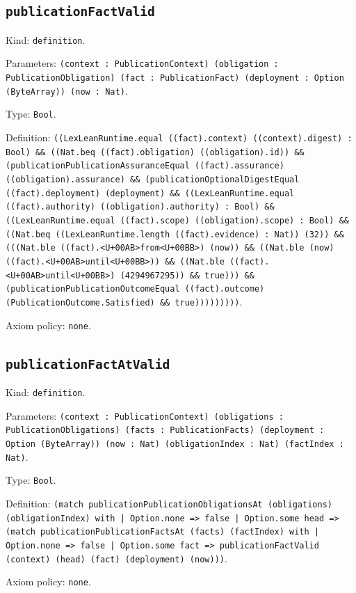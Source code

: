 \documentclass[11pt]{article}
\begin{document}
\subsection*{\texttt{publicationFactValid}}
\noindent Kind: \texttt{definition}.\par
\noindent Parameters: \texttt{(context : PublicationContext) (obligation : PublicationObligation) (fact : PublicationFact) (deployment : Option (ByteArray)) (now : Nat)}.\par
\noindent Type: \texttt{Bool}.\par
\noindent Definition: \texttt{((LexLeanRuntime.equal ((fact).context) ((context).digest) : Bool) \&\& ((Nat.beq ((fact).obligation) ((obligation).id)) \&\& (publicationPublicationAssuranceEqual ((fact).assurance) ((obligation).assurance) \&\& (publicationOptionalDigestEqual ((fact).deployment) (deployment) \&\& ((LexLeanRuntime.equal ((fact).authority) ((obligation).authority) : Bool) \&\& ((LexLeanRuntime.equal ((fact).scope) ((obligation).scope) : Bool) \&\& ((Nat.beq ((LexLeanRuntime.length ((fact).evidence) : Nat)) (32)) \&\& (((Nat.ble ((fact).<U+00AB>from<U+00BB>) (now)) \&\& ((Nat.ble (now) ((fact).<U+00AB>until<U+00BB>)) \&\& ((Nat.ble ((fact).<U+00AB>until<U+00BB>) (4294967295)) \&\& true))) \&\& (publicationPublicationOutcomeEqual ((fact).outcome) (PublicationOutcome.Satisfied) \&\& true)))))))))}.\par
\noindent Axiom policy: \texttt{none}.\par
\subsection*{\texttt{publicationFactAtValid}}
\noindent Kind: \texttt{definition}.\par
\noindent Parameters: \texttt{(context : PublicationContext) (obligations : PublicationObligations) (facts : PublicationFacts) (deployment : Option (ByteArray)) (now : Nat) (obligationIndex : Nat) (factIndex : Nat)}.\par
\noindent Type: \texttt{Bool}.\par
\noindent Definition: \texttt{(match publicationPublicationObligationsAt (obligations) (obligationIndex) with | Option.none => false | Option.some head => (match publicationPublicationFactsAt (facts) (factIndex) with | Option.none => false | Option.some fact => publicationFactValid (context) (head) (fact) (deployment) (now)))}.\par
\noindent Axiom policy: \texttt{none}.\par
\end{document}
